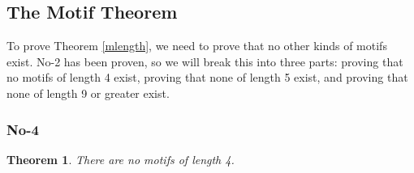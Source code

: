 \documentclass{article}
\newtheorem{theorem}{Theorem}[section]
\begin{document}
\subsection{The Motif Theorem}

To prove Theorem \ref{mlength}, we need to prove that no other kinds of motifs exist. No-2 has been proven, so we will break this into three parts: proving that no motifs of length 4 exist, proving that none of length 5 exist, and proving that none of length 9 or greater exist.

\subsubsection{No-4}

\begin{theorem}
There are no motifs of length 4.
\end{theorem}
\end{document}
